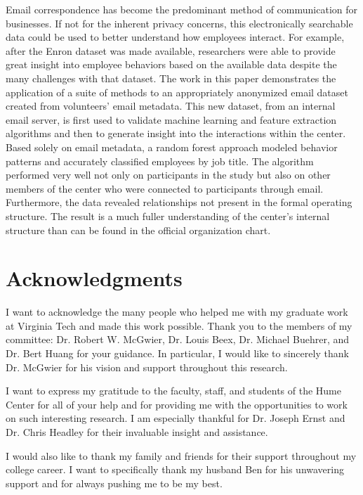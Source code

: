 \documentclass[12pt]{report}
\begin{document}
Email correspondence has become the predominant method of communication for businesses.
If not for the inherent privacy concerns, this electronically searchable data could be used to better understand how employees interact. 
For example, after the Enron dataset was made available, researchers were able to provide great insight into employee behaviors based on the available data despite the many challenges with that dataset.  
The work in this paper demonstrates the application of a suite of methods to an appropriately anonymized email dataset created from volunteers' email metadata.  
This new dataset, from an internal email server, is first used to validate machine learning and feature extraction algorithms and then to generate insight into the interactions within the center.  
Based solely on email metadata, a random forest approach modeled behavior patterns and accurately classified employees by job title.  
The algorithm performed very well not only on participants in the study but also on other members of the center who were connected to participants through email. 
Furthermore, the data revealed relationships not present in the formal operating structure. 
The result is a much fuller understanding of the center's internal structure than can be found in the official organization chart.


\vfill



\pagebreak

\chapter*{Acknowledgments}
I want to acknowledge the many people who helped me with my graduate work at Virginia Tech and made this work possible.  Thank you to the members of my committee: Dr. Robert W. McGwier, Dr. Louis Beex, Dr. Michael Buehrer, and Dr. Bert Huang for your guidance.  In particular, I would like to sincerely thank Dr. McGwier for his vision and support throughout this research.  

I want to express my gratitude to the faculty, staff, and students of the Hume Center for all of your help and for providing me with the opportunities to work on such interesting research.  I am especially thankful for Dr. Joseph Ernst and Dr. Chris Headley for their invaluable insight and assistance.

I would also like to thank my family and friends for their support throughout my college career.  I want to specifically thank my husband Ben for his unwavering support and for always pushing me to be my best.
\end{document}
